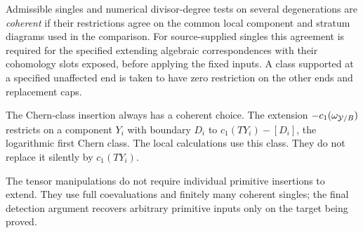\begin{definition}\label{conv:coherent}
Admissible singles and numerical divisor-degree tests on several degenerations are \emph{coherent} if their restrictions agree on the common local component and stratum diagrams used in the comparison. For source-supplied singles this agreement is required for the specified extending algebraic correspondences with their cohomology slots exposed, before applying the fixed inputs. A class supported at a specified unaffected end is taken to have zero restriction on the other ends and replacement caps.
\end{definition}

The Chern-class insertion always has a coherent choice. The extension
\(-c_1(\omega_{\mathcal Y/B})\) restricts on a component \(Y_i\) with boundary \(D_i\) to \(c_1(TY_i)-[D_i]\), the logarithmic first Chern class. The local calculations use this class. They do not replace it silently by \(c_1(TY_i)\).

The tensor manipulations do not require individual primitive insertions to extend. They use full coevaluations and finitely many coherent singles; the final detection argument recovers arbitrary primitive inputs only on the target being proved.
